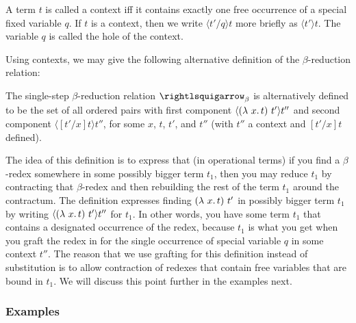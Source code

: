 \begin{definition}[context]
  A term $t$ is called a context iff it contains exactly one free
  occurrence of a special fixed variable $q$.  If $t$
  is a context, then we write $\langle t'/q \rangle t$ more briefly as
  $\langle t' \rangle t$.  The variable $q$ is called the hole of the
  context.
  \end{definition}

\noindent Using contexts, we may give the following alternative definition of the $\beta$-reduction relation:

\begin{definition}
\label{def:betactxt}
The single-step $\beta$-reduction relation
$\curva_\beta$ is alternatively defined to be the set of all ordered pairs with first component $\langle (\lambda\ x.\, t)\ t' \rangle t''$
  and second component $\langle [t'/x]t \rangle t''$, for some $x$, $t$, $t'$, and $t''$ (with $t''$ a context and $[t'/x]t$ defined).
\end{definition}

The idea of this definition is to express that (in operational terms)
if you find a $\beta$-redex somewhere in some possibly bigger term
$t_1$, then you may reduce $t_1$ by contracting that $\beta$-redex and
then rebuilding the rest of the term $t_1$ around the contractum.  The
definition expresses finding $(\lambda\ x.\, t)\ t'$ in possibly bigger
term $t_1$ by writing $\langle(\lambda\ x.\, t)\ t'\rangle t''$ for $t_1$.
In other words, you have some term $t_1$ that contains a designated
occurrence of the redex, because $t_1$ is what you get when you graft
the redex in for the single occurrence of special variable $q$ in some
context $t''$.  The reason that we use grafting for this definition
instead of substitution is to allow contraction of redexes that
contain free variables that are bound in $t_1$.  We will discuss this
point further in the examples next.

\subsubsection{Examples}
\label{sec:betaex}

